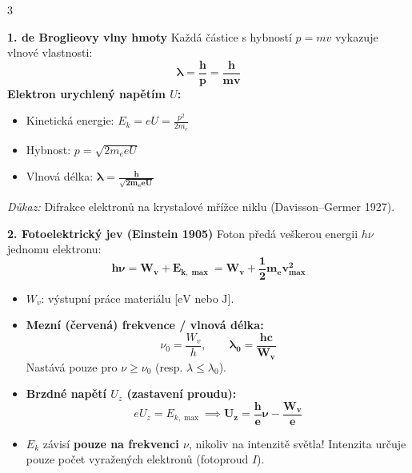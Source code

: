 \documentclass[9pt,a4paper]{article}
\begin{document}
\begin{tcolorbox}[secbox,title=2. KORPUSKULÁRNĚ-VLNOVÝ DUALISMUS, FOTOELEKTRICKÝ JEV A COMPTONŮV ROZPTYL]
\begin{multicols}{3}

\textbf{1. de Broglieovy vlny hmoty}
Každá částice s hybností $p = mv$ vykazuje vlnové vlastnosti:
\[\mathbf{\lambda = \frac{h}{p} = \frac{h}{m v}}\]
\textbf{Elektron urychlený napětím $U$:}
\begin{itemize}
  \item Kinetická energie: $E_k = eU = \frac{p^2}{2m_e}$
  \item Hybnost: $p = \sqrt{2m_e e U}$
  \item Vlnová délka: $\mathbf{\lambda = \frac{h}{\sqrt{2m_e e U}}}$
\end{itemize}
\emph{Důkaz:} Difrakce elektronů na krystalové mřížce niklu (Davisson--Germer 1927).

\columnbreak

\textbf{2. Fotoelektrický jev (Einstein 1905)}
Foton předá veškerou energii $h\nu$ jednomu elektronu:
\[\mathbf{h\nu = W_v + E_{k,\max} = W_v + \frac{1}{2}m_e v_{\max}^2}\]
\begin{itemize}
  \item $W_v$: výstupní práce materiálu [$\text{eV}$ nebo $\text{J}$].
  \item \textbf{Mezní (červená) frekvence / vlnová délka:}
  \[\nu_0 = \frac{W_v}{h}, \qquad \mathbf{\lambda_0 = \frac{hc}{W_v}}\]
  Nastává pouze pro $\nu \ge \nu_0$ (resp. $\lambda \le \lambda_0$).
  \item \textbf{Brzdné napětí $U_z$ (zastavení proudu):}
  \[e U_z = E_{k,\max} \implies \mathbf{U_z = \frac{h}{e}\nu - \frac{W_v}{e}}\]
  \item $E_k$ závisí \textbf{pouze na frekvenci $\nu$}, nikoliv na intenzitě světla! Intenzita určuje pouze počet vyražených elektronů (fotoproud $I$).
\end{itemize}

\begin{center}
\end{center}


\end{multicols}
\end{tcolorbox}
\end{document}
